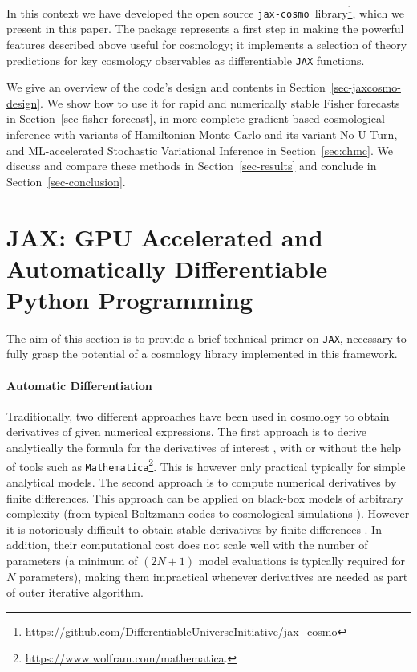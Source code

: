 \documentclass[twocolumn,twocolappendix,nofootinbib,iop]{openjournal}
\newcommand{\FrL}[1]{{\color{cyan}FL: #1}}
\newcommand{\jaxcosmo}{\texttt{jax-cosmo}}
\begin{document}
In this context we have developed the open source \jaxcosmo\ library\footnote{\url{https://github.com/DifferentiableUniverseInitiative/jax_cosmo}}, which we present in this paper. The package represents a first step in making the powerful features described above useful for cosmology; it implements a selection of theory predictions for key cosmology observables as differentiable \texttt{JAX} functions.


We give an overview of the code's design and contents in Section~\ref{sec-jaxcosmo-design}. We show how to use it for rapid and numerically stable Fisher forecasts in Section~\ref{sec-fisher-forecast}, in more complete gradient-based cosmological inference with variants of Hamiltonian Monte Carlo and its variant No-U-Turn, and ML-accelerated Stochastic Variational Inference in Section~\ref{sec:chmc}. We discuss and compare these methods in Section~\ref{sec-results} and conclude in Section~\ref{sec-conclusion}.



\section{JAX: GPU Accelerated and Automatically Differentiable Python Programming}
\label{sec-primer}

The aim of this section is to provide a brief technical primer on \texttt{JAX}, necessary to fully grasp the potential of a cosmology library implemented in this framework.


\paragraph{\textbf{Automatic Differentiation}} Traditionally, two different approaches have been used in cosmology to obtain derivatives of given numerical expressions. The first approach is to derive analytically the formula for the derivatives of interest \citep[e.g.][]{2013MNRAS.432..894J}, with or without the help of tools such as \texttt{Mathematica}\footnote{\url{https://www.wolfram.com/mathematica}.}. This is however only practical typically for simple analytical models.
The second approach is to compute numerical derivatives by finite differences. This approach can be applied on black-box models of arbitrary complexity (from typical Boltzmann codes to cosmological simulations \citep{2020ApJS..250....2V}). However it is notoriously difficult to obtain stable derivatives by finite differences \citep[e.g.][]{2021arXiv210100298B, 2021A&A...649A..52Y}. In addition, their computational cost does not scale well with the number of parameters (a minimum of $(2N+1)$ model evaluations is typically required for $N$ parameters), making them impractical whenever derivatives are needed as part of outer iterative algorithm.
\end{document}
